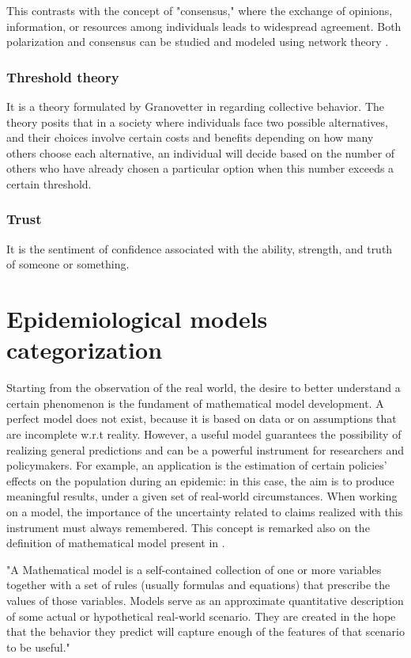 This contrasts with the concept of "consensus," where the exchange of opinions, information, or resources among individuals leads to widespread agreement. Both polarization and consensus can be studied and modeled using network theory \cite{Devia2022}.
\subsubsection{Threshold theory}
It is a theory formulated by Granovetter in \cite{Granovetter_1978} regarding collective behavior. The theory posits that in a society where individuals face two possible alternatives, and their choices involve certain costs and benefits depending on how many others choose each alternative, an individual will decide based on the number of others who have already chosen a particular option when this number exceeds a certain threshold.

\subsubsection{Trust} It is the sentiment of confidence associated with the ability, strength, and truth of someone or something. 

\section{Epidemiological models categorization}
\label{sec:models_categ}
Starting from the observation of the real world, the desire to better understand a certain phenomenon is the fundament of mathematical model development. A perfect model does not exist, because it is based on data or on assumptions that are incomplete w.r.t reality. However, a useful model guarantees the possibility of realizing general predictions and can be a powerful instrument for researchers and policymakers. For example, an application is the estimation of certain policies' effects on the population during an epidemic: in this case, the aim is to produce meaningful results, under a given set of real-world circumstances.
When working on a model, the importance of the uncertainty related to claims realized with this instrument must always remembered. This concept is remarked also on the definition of mathematical model present in \cite{Ledder_2023}. 
\begin{displayquote}
	"A Mathematical model is a self-contained collection of one or more variables together with a set of rules (usually formulas and equations) that prescribe the values of those variables. Models serve as an approximate quantitative description of some actual or hypothetical real-world scenario. They are created in the hope that the behavior they predict will capture enough of the features of that scenario to be useful."
\end{displayquote}

